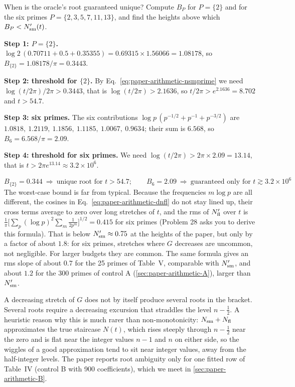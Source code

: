 \begin{sample}{When is the oracle's root guaranteed unique?}
Compute $B_P$ for $P=\{2\}$ and for the six primes $P=\{2,3,5,7,11,13\}$, and find the heights above which $B_P<N_{\mathrm{sm}}'(t)$.

\textbf{Step 1: $P=\{2\}$.} $\log2\,(0.70711+0.5+0.35355)=0.69315\times1.56066=1.08178$, so $B_{\{2\}}=1.08178/\pi=0.3443$.

\textbf{Step 2: threshold for $\{2\}$.} By Eq.~\eqref{eq:paper-arithmetic-nsmprime} we need $\log(t/2\pi)/2\pi>0.3443$, that is $\log(t/2\pi)>2.1636$, so $t/2\pi>e^{2.1636}=8.702$ and $t>54.7$.

\textbf{Step 3: six primes.} The six contributions $\log p\,(p^{-1/2}+p^{-1}+p^{-3/2})$ are $1.0818,\ 1.2119,\ 1.1856,\ 1.1185,\ 1.0067,\ 0.9634$; their sum is $6.568$, so $B_6 = 6.568/\pi = 2.09$.

\textbf{Step 4: threshold for six primes.} We need $\log(t/2\pi)>2\pi\times2.09=13.14$, that is $t>2\pi e^{13.14}\approx3.2\times10^6$.

\[
\boxed{B_{\{2\}}=0.344\ \Rightarrow\ \text{unique root for } t>54.7;\qquad B_6=2.09\ \Rightarrow\ \text{guaranteed only for } t\gtrsim3.2\times10^6}
\]
The worst-case bound is far from typical. Because the frequencies $m\log p$ are all different, the cosines in Eq.~\eqref{eq:paper-arithmetic-dnfl} do not stay lined up, their cross terms average to zero over long stretches of $t$, and the rms of $N_{\mathrm{fl}}'$ over $t$ is $\frac1\pi\bigl[\sum_p(\log p)^2\sum_m \frac{1}{2p^m}\bigr]^{1/2}=0.415$ for six primes (Problem 28 asks you to derive this formula). That is below $N_{\mathrm{sm}}'\approx0.75$ at the heights of the paper, but only by a factor of about $1.8$: for six primes, stretches where $G$ decreases are uncommon, not negligible. For larger budgets they are common. The same formula gives an rms slope of about $0.7$ for the 25 primes of Table~V, comparable with $N_{\mathrm{sm}}'$, and about $1.2$ for the 300 primes of control A (\cref{sec:paper-arithmetic-A}), larger than $N_{\mathrm{sm}}'$.

A decreasing stretch of $G$ does not by itself produce several roots in the bracket. Several roots require a decreasing excursion that straddles the level $n-\tfrac12$. A heuristic reason why this is much rarer than non-monotonicity: $N_{\mathrm{sm}}+N_{\mathrm{fl}}$ approximates the true staircase $N(t)$, which rises steeply through $n-\tfrac12$ near the zero and is flat near the integer values $n-1$ and $n$ on either side, so the wiggles of a good approximation tend to sit near integer values, away from the half-integer levels. The paper reports root ambiguity only for one fitted row of Table~IV (control B with 900 coefficients), which we meet in \cref{sec:paper-arithmetic-B}.
\end{sample}

